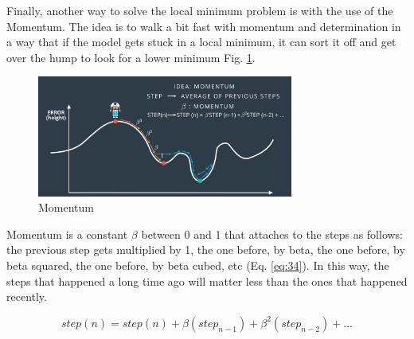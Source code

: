 \documentclass{article}
\begin{document}
Finally, another way to solve the local minimum problem is with the use of the Momentum. The idea is to walk a bit fast with momentum and determination in a way that if the model gets stuck in a local minimum, it can sort it off and get over the hump to look for a lower minimum Fig. \ref{fig:f41}.

\begin{figure}[ht]
    \centering
    \includegraphics[width=0.75\textwidth,height=0.75\textheight,keepaspectratio]{images/momentum.png}
    \captionsetup{justification=centering}
    \caption{Momentum}
    \label{fig:f41}
\end{figure}

Momentum is a constant \(\beta\) between 0 and 1 that attaches to the steps as follows: the previous step gets multiplied by 1, the one before, by beta, the one before, by beta squared, the one before, by beta cubed, etc (Eq. \eqref{eq:34}). In this way, the steps that happened a long time ago will matter less than the ones that happened recently.

\begin{equation}
\label{eq:34}
step(n) = step(n) + \beta(step_{n-1}) + \beta^2(step_{n-2}) + \dots
\end{equation}

\printbibliography
\end{document}
